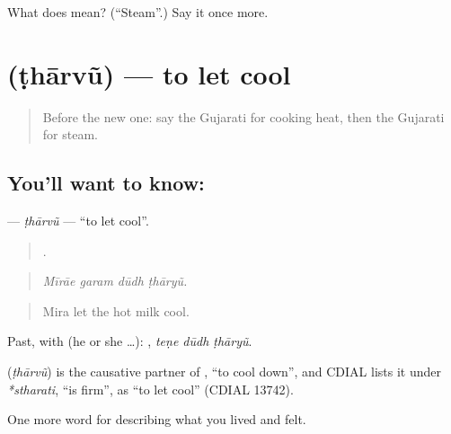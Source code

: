 \begin{tcolorbox}[breakable,colback=teal!4,colframe=teal!35!black,title={Before you move on}]
What does  mean? (\textquotedblleft{}Steam\textquotedblright{}.) Say it once more.
\end{tcolorbox}
\section[\texorpdfstring{\gu{ઠારવું} (ṭhārvũ)}{ઠારવું (ṭhārvũ)}]{ (ṭhārvũ) — to let cool}

\label{lesson:GU-C519-thaarvu}



\begin{quote}
Before the new one: say the Gujarati for cooking heat, then the Gujarati for steam.
\end{quote}

\subsection*{You'll want to know: }
\textbf{} — \emph{ṭhārvũ} — \textquotedblleft{}to let cool\textquotedblright{}.

\begin{quote}
   .
\end{quote}

\begin{quote}
\emph{Mīrāe garam dūdh ṭhāryũ.}
\end{quote}

\begin{quote}
Mira let the hot milk cool.
\end{quote}

Past, with  (he or she …):   , \emph{teṇe dūdh ṭhāryũ}.

\begin{cousinweb}
\textbf{} (\emph{ṭhārvũ}) is the causative partner of \textbf{}, \textquotedblleft{}to cool down\textquotedblright{}, and CDIAL lists it under \emph{*stharati}, \textquotedblleft{}is firm\textquotedblright{}, as \textquotedblleft{}to let cool\textquotedblright{} (CDIAL 13742).
\end{cousinweb}

\begin{grammarlens}[title={What you've built}]
One more word for describing what you lived and felt.
\end{grammarlens}

